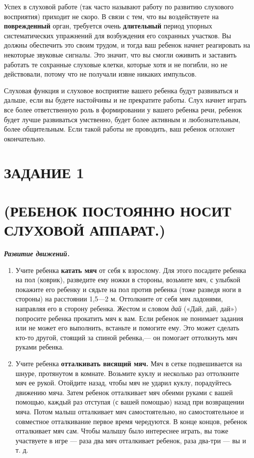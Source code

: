 \documentclass[a5paper]{book}
\renewcommand{\emph}[1]{\textit{#1}}
\begin{document}
Успех в слуховой работе (так часто называют работу по развитию слухового
восприятия) приходит не скоро. В связи с тем, что вы воздействуете на
\textbf{поврежденный} орган, требуется очень \textbf{длительный} период
упорных систематических упражнений для возбуждения его сохранных
участков. Вы должны обеспечить это своим трудом, и тогда ваш ребенок
начнет реагировать на некоторые звуковые сигналы. Это значит, что вы
смогли оживить и заставить работать те сохранные слуховые клетки,
которые хотя и не погибли, но не действовали, потому что не получали
извне никаких импульсов.

Слуховая функция и слуховое восприятие вашего ребенка будут развиваться
и дальше, если вы будете настойчивы и не прекратите работы. Слух начнет
играть все более ответственную роль в формировании у вашего ребенка
речи, ребенок будет лучше развиваться умственно, будет более активным и
любознательным, более общительным. Если такой работы не проводить, ваш
ребенок оглохнет окончательно.

\section{ЗАДАНИЕ 1}\section*{(РЕБЕНОК ПОСТОЯННО НОСИТ СЛУХОВОЙ АППАРАТ.)}

\emph{\textbf{Развитие движений.}}


\begin{enumerate}
\def\labelenumi{\arabic{enumi}.}
\item
  
  Учите ребенка \textbf{катать мяч} от себя к взрослому. Для этого
  посадите ребенка на пол (коврик), разведите ему ножки в стороны,
  возьмите мяч, с улыбкой покажите его ребенку и сядьте на пол против
  ребенка (тоже разведя ноги в стороны) на расстоянии 1,5---2 м.
  Оттолкните от себя мяч ладонями, направляя его в сторону ребенка.
  Жестом и словом \emph{дай} («Дай, дай, дай») попросите ребенка
  прокатить мяч к вам. Если ребенок не понимает задания или не может его
  выполнить, встаньте и помогите ему. Это может сделать кто-то другой,
  стоящий за спиной ребенка,--- он помогает оттолкнуть мяч руками
  ребенка.
  
\item
  
  Учите ребенка \textbf{отталкивать висящий мяч.} Мяч в сетке
  подвешивается на шнуре, протянутом в комнате. Возьмите куклу и
  несколько раз оттолкните мяч ее рукой. Отойдите назад, чтобы мяч не
  ударил куклу, порадуйтесь движению мяча. Затем ребенок отталкивает мяч
  обеими руками с вашей помощью, каждый раз отступая (с вашей помощью)
  назад при возвращении мяча. Потом малыш отталкивает мяч
  самостоятельно, но самостоятельное и совместное отталкивание первое
  время чередуются. В конце концов, ребенок отталкивает мяч сам. Чтобы
  малышу было интереснее играть, вы тоже участвуете в игре --- раза два
  мяч отталкивает ребенок, раза два-три --- вы и т. д.
  
\end{enumerate}
\end{document}
